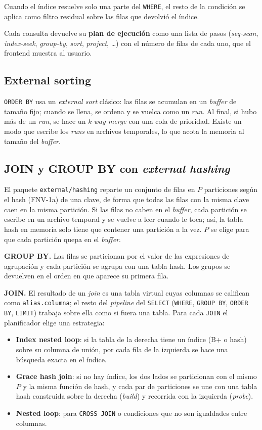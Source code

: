 \documentclass[11pt,a4paper]{article}
\begin{document}
Cuando el índice resuelve solo una parte del \texttt{WHERE}, el resto de la condición se aplica como filtro residual sobre las filas que devolvió el índice.

Cada consulta devuelve su \textbf{plan de ejecución} como una lista de pasos (\emph{seq-scan}, \emph{index-seek}, \emph{group-by}, \emph{sort}, \emph{project}, \dots) con el número de filas de cada uno, que el frontend muestra al usuario.

\subsection{External sorting}

\texttt{ORDER BY} usa un \emph{external sort} clásico: las filas se acumulan en un \emph{buffer} de tamaño fijo; cuando se llena, se ordena y se vuelca como un \emph{run}. Al final, si hubo más de un \emph{run}, se hace un \emph{k-way merge} con una cola de prioridad. Existe un modo que escribe los \emph{runs} en archivos temporales, lo que acota la memoria al tamaño del \emph{buffer}.

\subsection{JOIN y GROUP BY con \emph{external hashing}}

El paquete \texttt{external/hashing} reparte un conjunto de filas en $P$ particiones según el hash (FNV-1a) de una clave, de forma que todas las filas con la misma clave caen en la misma partición. Si las filas no caben en el \emph{buffer}, cada partición se escribe en un archivo temporal y se vuelve a leer cuando le toca; así, la tabla hash en memoria solo tiene que contener una partición a la vez. $P$ se elige para que cada partición quepa en el \emph{buffer}.

\textbf{GROUP BY.} Las filas se particionan por el valor de las expresiones de agrupación y cada partición se agrupa con una tabla hash. Los grupos se devuelven en el orden en que aparece su primera fila.

\textbf{JOIN.} El resultado de un \emph{join} es una tabla virtual cuyas columnas se califican como \texttt{alias.columna}; el resto del \emph{pipeline} del \texttt{SELECT} (\texttt{WHERE}, \texttt{GROUP BY}, \texttt{ORDER BY}, \texttt{LIMIT}) trabaja sobre ella como si fuera una tabla. Para cada \texttt{JOIN} el planificador elige una estrategia:

\begin{itemize}
  \item \textbf{Index nested loop}: si la tabla de la derecha tiene un índice (B+ o hash) sobre su columna de unión, por cada fila de la izquierda se hace una búsqueda exacta en el índice.
  \item \textbf{Grace hash join}: si no hay índice, los dos lados se particionan con el mismo $P$ y la misma función de hash, y cada par de particiones se une con una tabla hash construida sobre la derecha (\emph{build}) y recorrida con la izquierda (\emph{probe}).
  \item \textbf{Nested loop}: para \texttt{CROSS JOIN} o condiciones que no son igualdades entre columnas.
\end{itemize}
\end{document}
